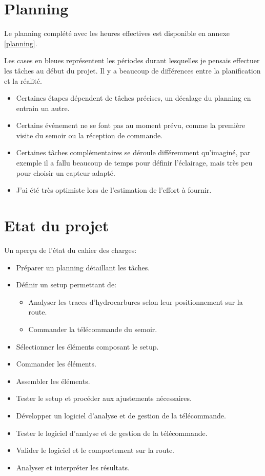 \section{Planning}
Le planning complété avec les heures effectives est disponible en annexe \ref{planning}.

Les cases en bleues représentent les périodes durant lesquelles je pensais effectuer les tâches au début du projet. Il y a beaucoup de différences entre la planification et la réalité.
\begin{itemize}
    \item Certaines étapes dépendent de tâches précises, un décalage du planning en entrain un autre.
    \item Certains événement ne se font pas au moment prévu, comme la première visite du semoir ou la réception de commande.
    \item Certaines tâches complémentaires se déroule différemment qu'imaginé, par exemple il a fallu beaucoup de temps pour définir l'éclairage, mais très peu pour choisir un capteur adapté.
    \item J'ai été très optimiste lors de l'estimation de l'effort à fournir.
\end{itemize}

\section{Etat du projet}
Un aperçu de l'état du cahier des charges:
\begin{itemize}
    \item {} Préparer un planning détaillant les tâches.
    \item Définir un setup permettant de:
          \begin{itemize}
              \item {} Analyser les traces d'hydrocarbures selon leur positionnement sur la route.
              \item {} Commander la télécommande du semoir.
          \end{itemize}
    \item {} Sélectionner les éléments composant le setup.
    \item {} Commander les éléments.
    \item {} Assembler les éléments.
    \item {} Tester le setup et procéder aux ajustements nécessaires.
    \item {} Développer un logiciel d'analyse et de gestion de la télécommande.
    \item {} Tester le logiciel d'analyse et de gestion de la télécommande.
    \item {} Valider le logiciel et le comportement sur la route.
    \item {} Analyser et interpréter les résultats.
\end{itemize}

